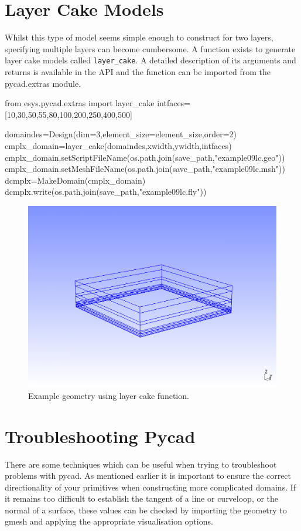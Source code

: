 \section{Layer Cake Models}
Whilst this type of model seems simple enough to construct for two layers,
specifying multiple layers can become cumbersome. A function exists to generate
layer cake models called \verb!layer_cake!. A detailed description of its
arguments and returns is available in the API and the function can be imported
from the pycad.extras module.
\begin{python}
from esys.pycad.extras import layer_cake
intfaces=[10,30,50,55,80,100,200,250,400,500]

domaindes=Design(dim=3,element_size=element_size,order=2)
cmplx_domain=layer_cake(domaindes,xwidth,ywidth,intfaces)
cmplx_domain.setScriptFileName(os.path.join(save_path,"example09lc.geo"))
cmplx_domain.setMeshFileName(os.path.join(save_path,"example09lc.msh"))
dcmplx=MakeDomain(cmplx_domain)
dcmplx.write(os.path.join(save_path,"example09lc.fly"))
\end{python}

\begin{figure}[ht]
\begin{center}
\includegraphics[width=5in]{figures/gmsh-example09lc.png}
\caption{Example geometry using layer cake function.}
\label{fig:gmsh3dlc}
\end{center}
\end{figure}
\clearpage
\section{Troubleshooting Pycad}
There are some techniques which can be useful when trying to troubleshoot
problems with pycad. As mentioned earlier it is important to ensure the correct
directionality of your primitives when constructing more complicated domains. If
it remains too difficult to establish the tangent of a line or curveloop, or
the normal of a surface, these values can be checked by importing the geometry
to gmesh and applying the appropriate visualisation options.

